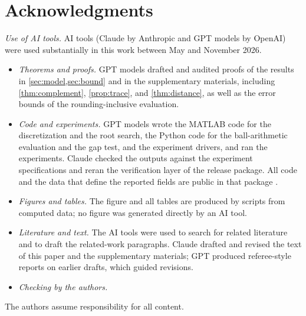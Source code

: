 \section*{Acknowledgments}
\emph{Use of AI tools.} AI tools (Claude by Anthropic and GPT models by OpenAI)
were used substantially in this work between May and November 2026.
\begin{itemize}
\item \emph{Theorems and proofs.} GPT models drafted and audited proofs of the
  results in \cref{sec:model,sec:bound} and in
  the supplementary materials, including \cref{thm:complement},
  \cref{prop:trace}, and \cref{thm:distance}, as well as the error bounds of the
  rounding-inclusive evaluation.
\item \emph{Code and experiments.} GPT models wrote the MATLAB code for the
  discretization and the root search, the Python code for the ball-arithmetic
  evaluation and the gap test, and the experiment drivers, and ran the
  experiments. Claude checked the outputs against the experiment specifications
  and reran the verification layer of the release package. All code and the
  data that define the reported fields are public in that package
  .
\item \emph{Figures and tables.} The figure and all tables are produced by
  scripts from computed data; no figure was generated directly by an AI tool.
\item \emph{Literature and text.} The AI tools were used to search for related
  literature and to draft the related-work paragraphs. Claude drafted and
  revised the text of this paper and the supplementary materials; GPT produced
  referee-style reports on earlier drafts, which guided revisions.
\item \emph{Checking by the authors.} 
\end{itemize}
The authors assume responsibility for all content.
